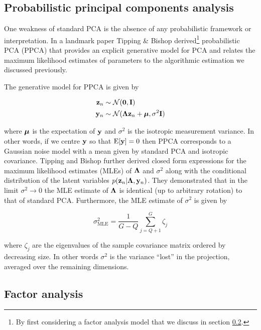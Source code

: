 \subsection{Probabilistic principal components analysis}

One weakness of standard PCA is the absence of any probabilistic framework or interpretation. In a landmark paper \cite{tipping1999probabilistic} Tipping \& Bishop derived\footnote{By first considering a factor analysis model that we discuss in section \ref{sec:intr:fa}.} probabilistic PCA (PPCA) that provides an explicit generative model for PCA and relates the maximum likelihood estimates of parameters to the algorithmic estimation we discussed previously.

The generative model for PPCA is given by

\begin{equation}
  \begin{aligned}
    \mathbf{z}_n & \sim \mathcal{N}(\bm{0}, \mathbf{I}) \\
    \mathbf{y}_n & \sim \mathcal{N}(\bm{\Lambda} \mathbf{z}_n + \bm{\mu}, \sigma^2 \mathbf{I})
  \end{aligned}
\end{equation}

where $\bm{\mu}$ is the expectation of $\mathbf{y}$ and $\sigma^2$ is the isotropic measurement variance. In other words, if we centre $\mathbf{y}$ so that $\text{E}[\mathbf{y}] = 0$ then PPCA corresponds to a Gaussian noise model with a mean given by standard PCA and isotropic covariance. Tipping and Bishop further derived closed form expressions for the maximum likelihood estimates (MLEs) of $\bm{\Lambda}$ and $\sigma^2$ along with the conditional distribution of the latent variables $p(\mathbf{z}_n | \bm{\Lambda}, \mathbf{y}_n)$. They demonstrated that in the limit $\sigma^2 \rightarrow 0$ the MLE estimate of $\bm{\Lambda}$ is identical (up to arbitrary rotation) to that of standard PCA. Furthermore, the MLE estimate of $\sigma^2$ is given by

\begin{equation}
  \sigma^2_{\text{MLE}} = \frac{1}{G-Q} \sum_{j = Q + 1}^G \zeta_j
\end{equation}

where $\zeta_j$ are the eigenvalues of the sample covariance matrix ordered by decreasing size. In other words $\sigma^2$ is the variance ``lost'' in the projection, averaged over the remaining dimensions.

\subsection{Factor analysis} \label{sec:intr:fa}

